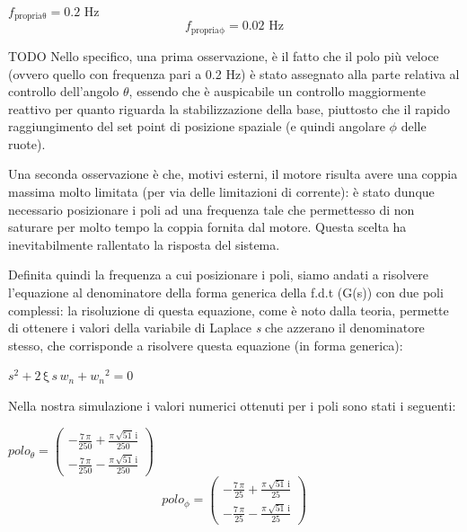 \begin{center}
	$
	f_{\mathrm{propria\theta}} =  0.2 \text{ Hz}
	$
	$$
	f_{\mathrm{propria\phi}} =  0.02 \text{ Hz}
	$$
\end{center}

TODO
Nello specifico, una prima osservazione, è il fatto che il polo più veloce (ovvero quello con frequenza pari a 0.2 Hz) è stato assegnato alla parte relativa al controllo dell'angolo $\theta$, essendo che è auspicabile un controllo maggiormente reattivo per quanto riguarda la stabilizzazione della base, piuttosto che il rapido raggiungimento del set point di posizione spaziale (e quindi angolare $\phi$ delle ruote).

Una seconda osservazione è che, motivi esterni, il motore risulta avere una coppia massima molto limitata (per via delle limitazioni di corrente): è stato dunque necessario posizionare i poli ad una frequenza tale che permettesso di non saturare per molto tempo la coppia fornita dal motore.
Questa scelta ha inevitabilmente rallentato la risposta del sistema.

Definita quindi la frequenza a cui posizionare i poli, siamo andati a risolvere l'equazione al denominatore della forma generica della f.d.t (G(s)) con due poli complessi: la risoluzione di questa equazione, come è noto dalla teoria, permette di ottenere i valori della variabile di Laplace \textit{s} che azzerano il denominatore stesso, che corrisponde a risolvere questa equazione (in forma generica):

\begin{center}
	$s^2 +2\,\mathrm{\xi}\,s\,{{w_n}} +{{{w_n}}}^2 =0$
\end{center}

Nella nostra simulazione i valori numerici ottenuti per i poli sono stati i seguenti:
\begin{center}
	$
	polo_{\theta} = \left(\begin{array}{c}
	-\frac{7\,\pi }{250}+\frac{\pi \,\sqrt{51}\,\mathrm{i}}{250}\\
	-\frac{7\,\pi }{250}-\frac{\pi \,\sqrt{51}\,\mathrm{i}}{250}
	\end{array}\right)
	$
	$$
	polo_{\phi} = \left(\begin{array}{c}
	-\frac{7\,\pi }{25}+\frac{\pi \,\sqrt{51}\,\mathrm{i}}{25}\\
	-\frac{7\,\pi }{25}-\frac{\pi \,\sqrt{51}\,\mathrm{i}}{25}
	\end{array}\right)
	$$
\end{center}	

